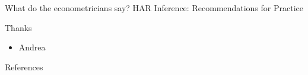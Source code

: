 \documentclass[aspectratio=169,12pt]{beamer} %
\begin{document}
\begin{frame}{What do the econometricians say?}
HAR Inference: Recommendations for Practice

\end{frame}

\begin{frame}{Thanks}
    \begin{itemize}
        \item Andrea
    \end{itemize}
\end{frame}

\begin{frame}{References}
%        
\end{frame}
\end{document}
